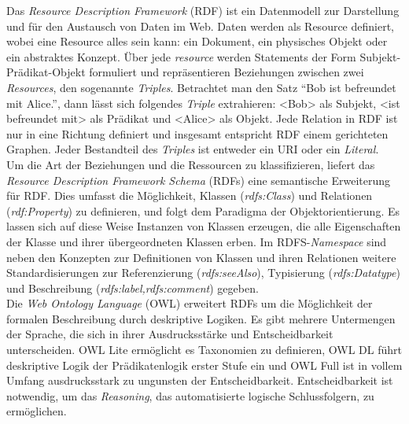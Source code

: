 \documentclass{article}
\begin{document}
    Das \emph{Resource Description Framework} (RDF) ist ein Datenmodell zur Darstellung und für den Austausch von Daten im Web. Daten werden als Resource definiert, wobei eine Resource alles sein kann: ein Dokument, ein physisches Objekt oder ein abstraktes Konzept. Über jede \emph{resource} werden Statements der Form Subjekt-Prädikat-Objekt formuliert und repräsentieren Beziehungen zwischen zwei \emph{Resources}, den sogenannte \emph{Triples}. Betrachtet man den Satz “Bob ist befreundet mit Alice.'', dann lässt sich folgendes \emph{Triple} extrahieren: <Bob> als Subjekt, <ist befreundet mit> als Prädikat und <Alice> als Objekt. Jede Relation in RDF ist nur in eine Richtung definiert und insgesamt entspricht RDF einem gerichteten Graphen. Jeder Bestandteil des \emph{Triples} ist entweder ein URI oder ein \emph{Literal}.\\
            
        Um die Art der Beziehungen und die Ressourcen zu klassifizieren, liefert das \emph{Resource Description Framework Schema }(RDFs) eine semantische Erweiterung für RDF. Dies umfasst die Möglichkeit, Klassen (\emph{rdfs:Class}) und Relationen (\emph{rdf:Property}) zu definieren, und folgt dem Paradigma der Objektorientierung. Es lassen sich auf diese Weise Instanzen von Klassen erzeugen, die alle Eigenschaften der Klasse und ihrer übergeordneten Klassen erben. Im RDFS-\emph{Namespace} sind neben den Konzepten zur Definitionen von Klassen und ihren Relationen weitere Standardisierungen zur Referenzierung (\emph{rdfs:seeAlso}), Typisierung (\emph{rdfs:Datatype}) und Beschreibung (\emph{rdfs:label,rdfs:comment}) gegeben.\\
            
        Die \emph{Web Ontology Language} (OWL) erweitert RDFs um die Möglichkeit der formalen Beschreibung durch deskriptive Logiken. Es gibt mehrere Untermengen der Sprache, die sich in ihrer Ausdrucksstärke und Entscheidbarkeit unterscheiden. OWL Lite ermöglicht es Taxonomien zu definieren, OWL DL führt deskriptive Logik der Prädikatenlogik erster Stufe ein und OWL Full ist in vollem Umfang ausdrucksstark zu ungunsten der Entscheidbarkeit. Entscheidbarkeit ist notwendig, um das \emph{Reasoning}, das automatisierte logische Schlussfolgern, zu ermöglichen.\\
            
\end{document}
